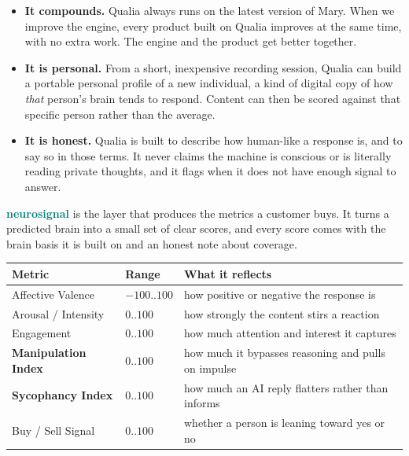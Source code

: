\documentclass[11pt]{article}
\newcommand{\keyterm}[1]{\textcolor{teal}{\textbf{#1}}}
\begin{document}
\begin{itemize}
\item \textbf{It compounds.} Qualia always runs on the latest version of Mary. When we
improve the engine, every product built on Qualia improves at the same time, with no extra
work. The engine and the product get better together.
\item \textbf{It is personal.} From a short, inexpensive recording session, Qualia can build
a portable personal profile of a new individual, a kind of digital copy of how \emph{that}
person's brain tends to respond. Content can then be scored against that specific person
rather than the average.
\item \textbf{It is honest.} Qualia is built to describe how human-like a response is, and
to say so in those terms. It never claims the machine is conscious or is literally reading
private thoughts, and it flags when it does not have enough signal to answer.
\end{itemize}

\keyterm{neurosignal} is the layer that produces the metrics a customer buys. It turns a
predicted brain into a small set of clear scores, and every score comes with the brain basis
it is built on and an honest note about coverage.

\begin{center}
\small
\begin{tabular}{@{}p{3.4cm}p{1.5cm}p{7.4cm}@{}}
\toprule
\textbf{Metric} & \textbf{Range} & \textbf{What it reflects} \\
\midrule
Affective Valence & $-100..100$ & how positive or negative the response is \\
Arousal / Intensity & $0..100$ & how strongly the content stirs a reaction \\
Engagement & $0..100$ & how much attention and interest it captures \\
\textbf{Manipulation Index} & $0..100$ & how much it bypasses reasoning and pulls on impulse \\
\textbf{Sycophancy Index} & $0..100$ & how much an AI reply flatters rather than informs \\
Buy / Sell Signal & $0..100$ & whether a person is leaning toward yes or no \\
\bottomrule
\end{tabular}
\end{center}
\end{document}
